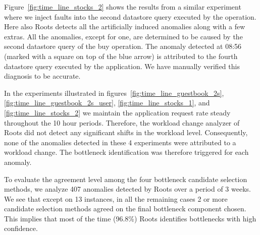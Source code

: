 Figure~\ref{fig:time_line_stocks_2} shows the results from a similar experiment where we inject
faults into the second datastore query executed by the operation. Here also Roots detects all the
artificially induced anomalies along with a few extras. All the anomalies, except for one, 
are determined to be caused by the second
datastore query of the buy operation. The anomaly detected at 08:56 (marked with a square on top of the blue arrow) 
is attributed to the fourth datastore query executed by the application. We have manually verified this
diagnosis to be accurate. 

In the experiments illustrated in figures~\ref{fig:time_line_guestbook_2s}, \ref{fig:time_line_guestbook_2s_user}, 
\ref{fig:time_line_stocks_1}, and \ref{fig:time_line_stocks_2} we maintain
the application request rate steady throughout the 10 hour periods. Therefore,
the workload change analyzer of Roots did not detect any significant shifts in the workload level. 
Consequently, none of the anomalies detected in these 4 experiments were attributed to a workload change.
The bottleneck identification was therefore triggered for each anomaly.

To evaluate the agreement level among the four bottleneck candidate selection methods, we analyze 407
anomalies detected by Roots over a period of 3 weeks. We see that except on 13 instances, in all the 
remaining cases 2 or more candidate selection methods agreed on the final bottleneck component chosen.
This implies that most of the time (96.8\%) Roots 
identifies bottlenecks with high confidence.



